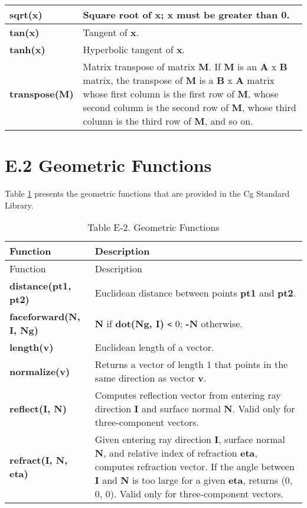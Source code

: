 \documentclass[../main.tex]{subfiles}
\begin{document}
\begin{longtable}{ p{3cm} p{9cm}  }
\hline
\textbf{sqrt(x)} & Square root of \textbf{x}; \newline \textbf{x} must be greater than 0. \\
\hline
\textbf{tan(x)} & Tangent of \textbf{x}. \\
\hline
\textbf{tanh(x)} & Hyperbolic tangent of \textbf{x}. \\
\hline
\textbf{transpose(M)} & Matrix transpose of matrix \textbf{M}. \newline If \textbf{M} is an \textbf{A} x \textbf{B} matrix, the transpose of \textbf{M} is a \textbf{B} x \textbf{A} matrix whose first column is the first row of \textbf{M}, whose second column is the second row of \textbf{M}, whose third column is the third row of \textbf{M}, and so on. \\
\hline

\end{longtable}
\FloatBarrier

\section{E.2 Geometric Functions}

Table \ref{table:E-2} presents the geometric functions that are provided in the Cg Standard Library.

\FloatBarrier
\begin{longtable}{ p{3cm} p{9cm}  }
\caption{Table E-2. Geometric Functions\label{table:E-2}} \\

Function & Description \\
\hline
\endfirsthead
Function & Description \\
\hline
\endhead
\endfoot
\endlastfoot

\textbf{distance(pt1, pt2)} & Euclidean distance between points \textbf{pt1} and \textbf{pt2}. \\
\hline
\textbf{faceforward(N, I, Ng)} & \textbf{N} if \textbf{dot(Ng, I)} \verb!<! 0; \textbf{-N} otherwise. \\
\hline
\textbf{length(v)} & Euclidean length of a vector. \\
\hline
\textbf{normalize(v)} & Returns a vector of length 1 that points in the same direction as vector \textbf{v}. \\
\hline
\textbf{reflect(I, N)} & Computes reflection vector from entering ray direction \textbf{I} and surface normal \textbf{N}. \newline Valid only for three-component vectors. \\
\hline
\textbf{refract(I, N, eta)} & Given entering ray direction \textbf{I}, surface normal \textbf{N}, and relative index of refraction \textbf{eta}, computes refraction vector. \newline If the angle between \textbf{I} and \textbf{N} is too large for a given \textbf{eta}, returns (0, 0, 0). \newline Valid only for three-component vectors. \\
\hline

\end{longtable}
\FloatBarrier
\end{document}
